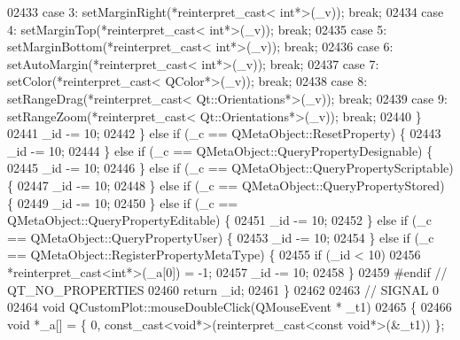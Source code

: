 \begin{DoxyCode}
02433         \textcolor{keywordflow}{case} 3: setMarginRight(*reinterpret\_cast< int*>(\_v)); \textcolor{keywordflow}{break};
02434         \textcolor{keywordflow}{case} 4: setMarginTop(*reinterpret\_cast< int*>(\_v)); \textcolor{keywordflow}{break};
02435         \textcolor{keywordflow}{case} 5: setMarginBottom(*reinterpret\_cast< int*>(\_v)); \textcolor{keywordflow}{break};
02436         \textcolor{keywordflow}{case} 6: setAutoMargin(*reinterpret\_cast< int*>(\_v)); \textcolor{keywordflow}{break};
02437         \textcolor{keywordflow}{case} 7: setColor(*reinterpret\_cast< QColor*>(\_v)); \textcolor{keywordflow}{break};
02438         \textcolor{keywordflow}{case} 8: setRangeDrag(*reinterpret\_cast< Qt::Orientations*>(\_v)); \textcolor{keywordflow}{break};
02439         \textcolor{keywordflow}{case} 9: setRangeZoom(*reinterpret\_cast< Qt::Orientations*>(\_v)); \textcolor{keywordflow}{break};
02440         \}
02441         \_id -= 10;
02442     \} \textcolor{keywordflow}{else} \textcolor{keywordflow}{if} (\_c == QMetaObject::ResetProperty) \{
02443         \_id -= 10;
02444     \} \textcolor{keywordflow}{else} \textcolor{keywordflow}{if} (\_c == QMetaObject::QueryPropertyDesignable) \{
02445         \_id -= 10;
02446     \} \textcolor{keywordflow}{else} \textcolor{keywordflow}{if} (\_c == QMetaObject::QueryPropertyScriptable) \{
02447         \_id -= 10;
02448     \} \textcolor{keywordflow}{else} \textcolor{keywordflow}{if} (\_c == QMetaObject::QueryPropertyStored) \{
02449         \_id -= 10;
02450     \} \textcolor{keywordflow}{else} \textcolor{keywordflow}{if} (\_c == QMetaObject::QueryPropertyEditable) \{
02451         \_id -= 10;
02452     \} \textcolor{keywordflow}{else} \textcolor{keywordflow}{if} (\_c == QMetaObject::QueryPropertyUser) \{
02453         \_id -= 10;
02454     \} \textcolor{keywordflow}{else} \textcolor{keywordflow}{if} (\_c == QMetaObject::RegisterPropertyMetaType) \{
02455         \textcolor{keywordflow}{if} (\_id < 10)
02456             *\textcolor{keyword}{reinterpret\_cast<}\textcolor{keywordtype}{int}*\textcolor{keyword}{>}(\_a[0]) = -1;
02457         \_id -= 10;
02458     \}
02459 \textcolor{preprocessor}{#endif // QT\_NO\_PROPERTIES}
02460     \textcolor{keywordflow}{return} \_id;
02461 \}
02462 
02463 \textcolor{comment}{// SIGNAL 0}
02464 \textcolor{keywordtype}{void} QCustomPlot::mouseDoubleClick(QMouseEvent * \_t1)
02465 \{
02466     \textcolor{keywordtype}{void} *\_a[] = \{ 0, \textcolor{keyword}{const\_cast<}\textcolor{keywordtype}{void}*\textcolor{keyword}{>}(\textcolor{keyword}{reinterpret\_cast<}\textcolor{keyword}{const }\textcolor{keywordtype}{void}*\textcolor{keyword}{>}(&\_t1)) \};

\end{DoxyCode}
